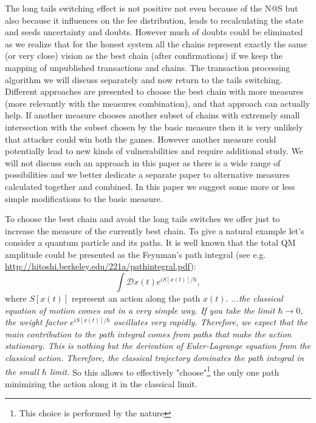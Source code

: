 \documentclass[12pt]{article}
\begin{document}
The long tails switching effect is not positive not even because of the N@S but also because it influences on the fee distribution, 
leads to recalculating the state and seeds uncertainty and doubts. However much of doubts could be eliminated as we realize that for the 
honest system all the chains represent exactly the same (or very close) vision as the best chain (after confirmations) if we keep the 
mapping of unpublished transactions and chains. The transaction processing algorithm we will discuss separately and now return to 
the tails switching. Different approaches are presented to choose the best chain with more measures (more relevantly with the measures combination), 
and that approach can actually help. If another measure chooses another subset of chains with extremely small intersection with
the subset chosen by the basic measure then it is very unlikely that attacker could win both the games. However another measure could
potentially lead to new kinds of vulnerabilities and require additional study. We will not discuss such an approach in this paper as
there is a wide range of possibilities and we better dedicate a separate paper to alternative measures calculated together and combined.
In this paper we suggest some more or less simple modifications to the basic measure. 

To choose the best chain and avoid the long tails switches we offer just to increase the measure of the currently best chain. To give a 
natural example let's consider a quantum particle and its paths. It is well known that the total QM amplitude could be presented as 
the Feynman's path integral (see e.g. \url{http://hitoshi.berkeley.edu/221a/pathintegral.pdf}): 
$$
\int \mathcal{D}x(t)e^{iS[x(t)]/\hbar},
$$
where $S[x(t)]$ represent an action along the path $x(t)$. {\it ...the classical equation of motion comes out in a very simple way.
If you take the limit $\hbar\to 0$, the weight factor $e^{iS[x(t)]/\hbar}$ oscillates very rapidly. Therefore, we expect that the main
contribution to the path integral comes from paths that make the action stationary. This is nothing but the derivation of Euler-Lagrange 
equation from the classical action. Therefore, the classical trajectory dominates the path integral in the small $\hbar$ limit.}
So this allows to effectively "choose"\footnote{This choice is performed by the nature} the only one path minimizing the action along it in the
classical limit. 
\end{document}
